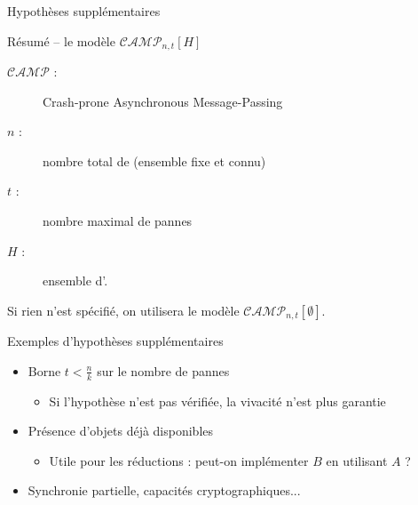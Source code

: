 
\begingroup

\begin{frame}{Hypothèses supplémentaires}
  
  \begin{block}{Résumé -- le modèle $\mathcal{CAMP}_{n,t}[H]$}
    \begin{description}
    \item[$\mathcal{CAMP}$ :] Crash-prone Asynchronous Message-Passing
    \item[$n$ :] nombre total de  (ensemble fixe et connu)
    \item[$t$ :] nombre maximal de pannes 
    \item[$H$ :] ensemble d'. 
    \end{description}
  \end{block}
  
  Si rien n'est spécifié, on utilisera le modèle \alert{$\mathcal{CAMP}_{n,t}[\emptyset]$}.

  \vspace{4mm}
  
  \begin{exampleblock}{Exemples d'hypothèses supplémentaires}
    \begin{itemize}
    \item Borne \alert{$t < \frac{n}{k}$} sur le nombre de pannes
      \begin{itemize}
      \item Si l'hypothèse n'est pas vérifiée, la vivacité n'est plus garantie
      \end{itemize}
    \item Présence d'\alert{objets déjà disponibles}
      \begin{itemize}
      \item Utile pour les réductions : peut-on implémenter $B$ en utilisant $A$ ? 
      \end{itemize}
    \item Synchronie partielle, capacités cryptographiques...
    \end{itemize}
  \end{exampleblock}

\end{frame}

\endgroup
\endinput

